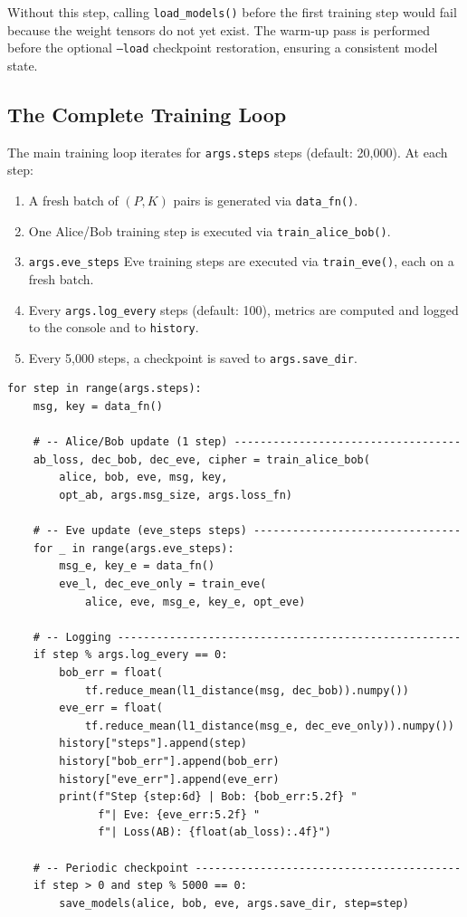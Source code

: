 \documentclass[12pt, a4paper]{article}
\newcommand{\code}[1]{\texttt{\color{CodeRed}#1}}
\begin{document}
Without this step, calling \code{load\_models()} before the first
training step would fail because the weight tensors do not yet exist.
The warm-up pass is performed before the optional \code{--load}
checkpoint restoration, ensuring a consistent model state.

\subsection{The Complete Training Loop}
\label{subsec:training_loop}

The main training loop iterates for \code{args.steps} steps
(default: 20{,}000). At each step:

\begin{enumerate}[leftmargin=2em, itemsep=4pt]
  \item A fresh batch of $(P, K)$ pairs is generated via \code{data\_fn()}.
  \item One Alice/Bob training step is executed via \code{train\_alice\_bob()}.
  \item \code{args.eve\_steps} Eve training steps are executed via
        \code{train\_eve()}, each on a fresh batch.
  \item Every \code{args.log\_every} steps (default: 100), metrics are
        computed and logged to the console and to \code{history}.
  \item Every 5{,}000 steps, a checkpoint is saved to \code{args.save\_dir}.
\end{enumerate}

\begin{lstlisting}[caption={The complete training loop in \code{main()}}]
for step in range(args.steps):
    msg, key = data_fn()

    # -- Alice/Bob update (1 step) -----------------------------------
    ab_loss, dec_bob, dec_eve, cipher = train_alice_bob(
        alice, bob, eve, msg, key,
        opt_ab, args.msg_size, args.loss_fn)

    # -- Eve update (eve_steps steps) --------------------------------
    for _ in range(args.eve_steps):
        msg_e, key_e = data_fn()
        eve_l, dec_eve_only = train_eve(
            alice, eve, msg_e, key_e, opt_eve)

    # -- Logging -----------------------------------------------------
    if step % args.log_every == 0:
        bob_err = float(
            tf.reduce_mean(l1_distance(msg, dec_bob)).numpy())
        eve_err = float(
            tf.reduce_mean(l1_distance(msg_e, dec_eve_only)).numpy())
        history["steps"].append(step)
        history["bob_err"].append(bob_err)
        history["eve_err"].append(eve_err)
        print(f"Step {step:6d} | Bob: {bob_err:5.2f} "
              f"| Eve: {eve_err:5.2f} "
              f"| Loss(AB): {float(ab_loss):.4f}")

    # -- Periodic checkpoint -----------------------------------------
    if step > 0 and step % 5000 == 0:
        save_models(alice, bob, eve, args.save_dir, step=step)
\end{lstlisting}
\end{document}
